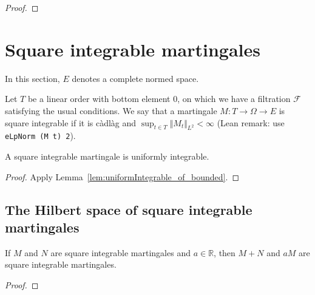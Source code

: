 \begin{proof}

\end{proof}


\section{Square integrable martingales}

In this section, $E$ denotes a complete normed space.

\begin{definition}\label{def:IsSquareIntegrable}
  \leanok
Let $T$ be a linear order with bottom element 0, on which we have a filtration $\mathcal{F}$ satisfying the usual conditions.
We say that a martingale $M : T \to \Omega \to E$ is square integrable if it is càdlàg and $\sup_{t \in T} \Vert M_t \Vert_{L^2} < \infty$ (Lean remark: use \texttt{eLpNorm (M t) 2}).
\end{definition}


\begin{lemma}\label{lem:IsSquareIntegrable.uniformIntegrable}
  \leanok
  A square integrable martingale is uniformly integrable.
\end{lemma}

\begin{proof}
  \leanok
Apply Lemma~\ref{lem:uniformIntegrable_of_bounded}.
\end{proof}


\subsection{The Hilbert space of square integrable martingales}


\begin{lemma}\label{lem:IsSquareIntegrable.module}
  \leanok
If $M$ and $N$ are square integrable martingales and $a \in \mathbb{R}$, then $M + N$ and $a M$ are square integrable martingales.
\end{lemma}

\begin{proof}
\end{proof}


